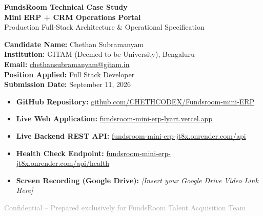 \documentclass[11pt,a4paper]{article}
\begin{document}
\begin{titlepage}
    \centering
    \vspace*{1.5cm}
    
    {\Huge \textbf{\textcolor{secondary}{FundsRoom Technical Case Study}}}\\[0.4cm]
    {\LARGE \textbf{\textcolor{primary}{Mini ERP + CRM Operations Portal}}}\\[0.2cm]
    {\large Production Full-Stack Architecture \& Operational Specification}\\[1.5cm]
    
    \begin{tcolorbox}[colback=lightgray,colframe=primary,arc=4mm,width=0.92\textwidth]
        \centering
        \vspace{0.2cm}
        \textbf{Candidate Name:} Chethan Subramanyam\\[0.15cm]
        \textbf{Institution:} GITAM (Deemed to be University), Bengaluru\\[0.15cm]
        \textbf{Email:} \href{mailto:chethansubramanyam@gitam.in}{chethansubramanyam@gitam.in}\\[0.15cm]
        \textbf{Position Applied:} Full Stack Developer\\[0.15cm]
        \textbf{Submission Date:} September 11, 2026
        \vspace{0.2cm}
    \end{tcolorbox}
    
    \vspace{1.5cm}
    
    \begin{tcolorbox}[colback=white,colframe=bordercolor,arc=2mm,width=0.92\textwidth,title=\textbf{\textcolor{secondary}{Quick Access Live Links}}]
        \small
        \begin{itemize}[leftmargin=1.5em, itemsep=0.3em]
            \item \textbf{GitHub Repository:} \href{https://github.com/CHETHCODEX/Fundsroom-mini-ERP}{github.com/CHETHCODEX/Fundsroom-mini-ERP}
            \item \textbf{Live Web Application:} \href{https://fundsroom-mini-erp-lyart.vercel.app}{fundsroom-mini-erp-lyart.vercel.app}
            \item \textbf{Live Backend REST API:} \href{https://fundsroom-mini-erp-jt8x.onrender.com/api}{fundsroom-mini-erp-jt8x.onrender.com/api}
            \item \textbf{Health Check Endpoint:} \href{https://fundsroom-mini-erp-jt8x.onrender.com/api/health}{fundsroom-mini-erp-jt8x.onrender.com/api/health}
            \item \textbf{Screen Recording (Google Drive):} \textit{[Insert your Google Drive Video Link Here]}
        \end{itemize}
    \end{tcolorbox}
    
    \vfill
    {\footnotesize \textcolor{darkgray}{Confidential -- Prepared exclusively for FundsRoom Talent Acquisition Team}}
\end{titlepage}
\end{document}
